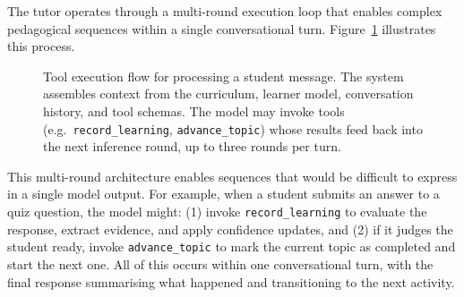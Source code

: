 \documentclass[logo,bsc,singlespacing,parskip,online]{infthesis}
\begin{document}
The tutor operates through a multi-round execution loop that enables complex pedagogical sequences within a single conversational turn. Figure~\ref{fig:tool-flow} illustrates this process.

\begin{figure}[ht]
\centering
{}
\caption{Tool execution flow for processing a student message. The system assembles context from the curriculum, learner model, conversation history, and tool schemas. The model may invoke tools (e.g.\ \texttt{record\_learning}, \texttt{advance\_topic}) whose results feed back into the next inference round, up to three rounds per turn.}
\label{fig:tool-flow}
\end{figure}

This multi-round architecture enables sequences that would be difficult to express in a single model output. For example, when a student submits an answer to a quiz question, the model might: (1) invoke \texttt{record\_learning} to evaluate the response, extract evidence, and apply confidence updates, and (2) if it judges the student ready, invoke \texttt{advance\_topic} to mark the current topic as completed and start the next one. All of this occurs within one conversational turn, with the final response summarising what happened and transitioning to the next activity.
\end{document}
